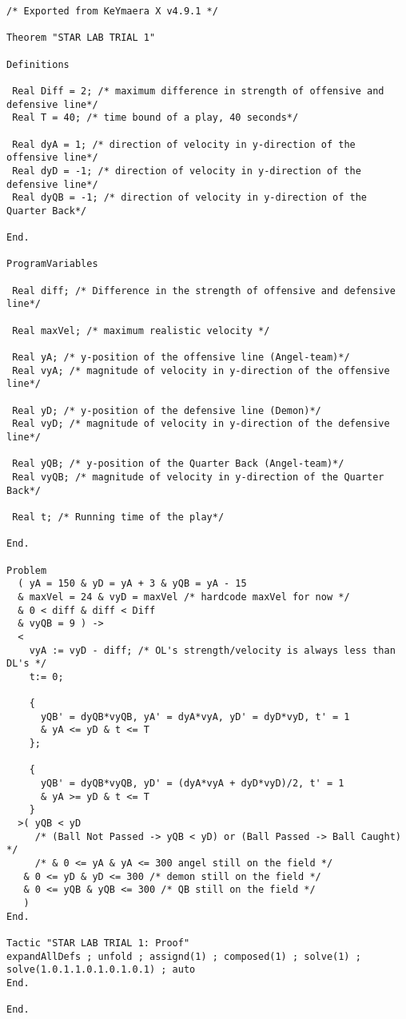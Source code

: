 \begin{lstlisting}
/* Exported from KeYmaera X v4.9.1 */

Theorem "STAR LAB TRIAL 1"

Definitions

 Real Diff = 2; /* maximum difference in strength of offensive and defensive line*/
 Real T = 40; /* time bound of a play, 40 seconds*/

 Real dyA = 1; /* direction of velocity in y-direction of the offensive line*/
 Real dyD = -1; /* direction of velocity in y-direction of the defensive line*/
 Real dyQB = -1; /* direction of velocity in y-direction of the Quarter Back*/

End.

ProgramVariables

 Real diff; /* Difference in the strength of offensive and defensive line*/

 Real maxVel; /* maximum realistic velocity */

 Real yA; /* y-position of the offensive line (Angel-team)*/
 Real vyA; /* magnitude of velocity in y-direction of the offensive line*/

 Real yD; /* y-position of the defensive line (Demon)*/
 Real vyD; /* magnitude of velocity in y-direction of the defensive line*/

 Real yQB; /* y-position of the Quarter Back (Angel-team)*/
 Real vyQB; /* magnitude of velocity in y-direction of the Quarter Back*/

 Real t; /* Running time of the play*/

End.

Problem
  ( yA = 150 & yD = yA + 3 & yQB = yA - 15
  & maxVel = 24 & vyD = maxVel /* hardcode maxVel for now */
  & 0 < diff & diff < Diff
  & vyQB = 9 ) ->
  <
    vyA := vyD - diff; /* OL's strength/velocity is always less than DL's */
    t:= 0;

    {
      yQB' = dyQB*vyQB, yA' = dyA*vyA, yD' = dyD*vyD, t' = 1
      & yA <= yD & t <= T
    };

    {
      yQB' = dyQB*vyQB, yD' = (dyA*vyA + dyD*vyD)/2, t' = 1
      & yA >= yD & t <= T
    }
  >( yQB < yD
     /* (Ball Not Passed -> yQB < yD) or (Ball Passed -> Ball Caught) */
     /* & 0 <= yA & yA <= 300 angel still on the field */
   & 0 <= yD & yD <= 300 /* demon still on the field */
   & 0 <= yQB & yQB <= 300 /* QB still on the field */
   )
End.

Tactic "STAR LAB TRIAL 1: Proof"
expandAllDefs ; unfold ; assignd(1) ; composed(1) ; solve(1) ; solve(1.0.1.1.0.1.0.1.0.1) ; auto
End.

End.
\end{lstlisting}

